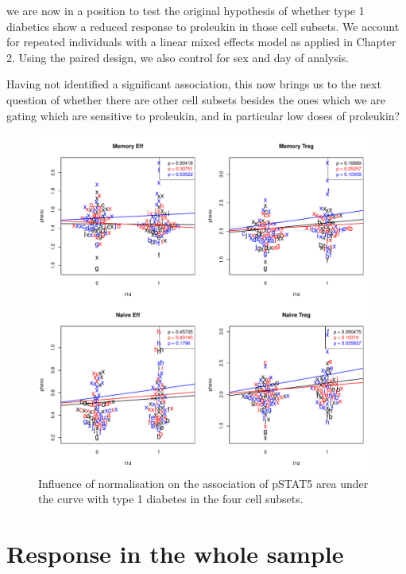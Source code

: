we are now in a position to test
the original hypothesis of whether type 1 diabetics show a reduced response to proleukin in those cell subsets.
We account for repeated individuals with a linear mixed effects model as applied in Chapter 2.%
Using the paired design, we also control for sex and day of analysis.

Having not identified a significant association, this now brings us to the next question of whether there are other
cell subsets besides the ones which we are gating which are sensitive to proleukin, and in particular low doses of proleukin?

\begin{figure}[h]
    \centering
    \includegraphics[scale=.5]{IL2/figures/pstat5-auc-t1d-celltypes.pdf}
    { Influence of normalisation on the association of pSTAT5 area under the curve with type 1 diabetes in the four cell subsets. }
    { }
\end{figure}

\section{Response in the whole sample}

